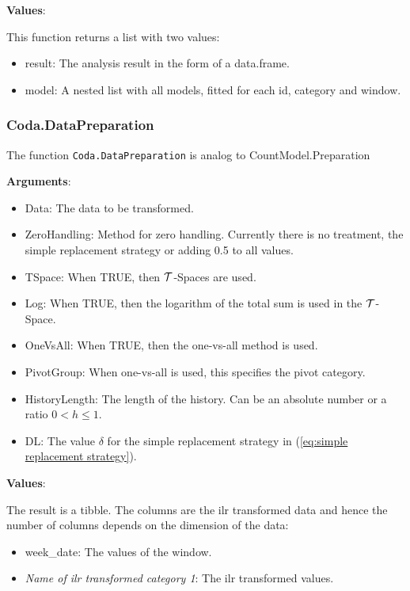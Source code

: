 \textbf{Values}:

This function returns a list with two values:

\begin{itemize}
	\item result: The analysis result in the form of a data.frame. 
	\item model: A nested list with all models, fitted for each id, category and window.
\end{itemize}

\subsubsection{Coda.DataPreparation}
\label{sec:Coda.DataPreparation}

The function \texttt{Coda.DataPreparation} is analog to CountModel.Preparation

\textbf{Arguments}:
\begin{itemize}
  \item Data: The data to be transformed.
  \item ZeroHandling: Method for zero handling.  Currently there is no treatment, the simple replacement strategy or adding 0.5 to all values. 
  \item TSpace: When TRUE, then $\mathcal{T}$-Spaces are used.
  \item Log: When TRUE, then the logarithm of the total sum is used in the $\mathcal{T}$-Space.
  \item OneVsAll: When TRUE, then the one-vs-all method is used.
  \item PivotGroup: When one-vs-all is used, this specifies the pivot category.
  \item HistoryLength: The length of the history. Can be an absolute number or a ratio $0<h\leq 1$.
	\item DL: The value $\delta$ for the simple replacement strategy in (\ref{eq:simple replacement strategy}). 
\end{itemize}

\textbf{Values}:

The result is a tibble. The columns are the ilr transformed data and hence the number of columns depends on the dimension of the data:

\begin{itemize}
	\item week\_date: The values of the window.
	\item \textit{Name of ilr transformed category 1}: The ilr transformed values.
\end{itemize}

